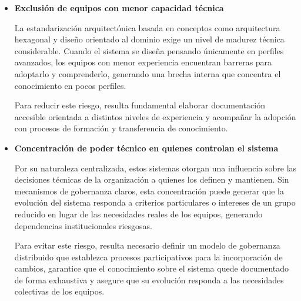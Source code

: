 \begin{itemize}
    \item \textbf{Exclusión de equipos con menor capacidad técnica}  
    
    La estandarización arquitectónica basada en conceptos como arquitectura hexagonal y diseño orientado al dominio exige un nivel de madurez técnica considerable. Cuando el sistema se diseña pensando únicamente en perfiles avanzados, los equipos con menor experiencia encuentran barreras para adoptarlo y comprenderlo, generando una brecha interna que concentra el conocimiento en pocos perfiles. 
    
    Para reducir este riesgo, resulta fundamental elaborar documentación accesible orientada a distintos niveles de experiencia y acompañar la adopción con procesos de formación y transferencia de conocimiento.
    
    \item \textbf{Concentración de poder técnico en quienes controlan el sistema}  

    Por su naturaleza centralizada, estos sistemas otorgan una influencia sobre las decisiones técnicas de la organización a quienes los definen y mantienen. Sin mecanismos de gobernanza claros, esta concentración puede generar que la evolución del sistema responda a criterios particulares o intereses de un grupo reducido en lugar de las necesidades reales de los equipos, generando dependencias institucionales riesgosas.
    
    Para evitar este riesgo, resulta necesario definir un modelo de gobernanza distribuido que establezca procesos participativos para la incorporación de cambios, garantice que el conocimiento sobre el sistema quede documentado de forma exhaustiva y asegure que su evolución responda a las necesidades colectivas de los equipos.
       
\end{itemize}

